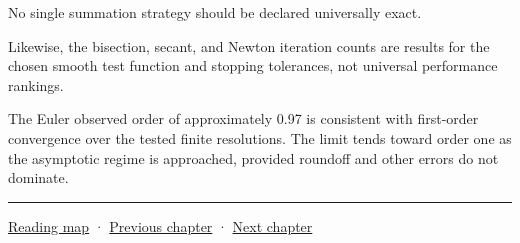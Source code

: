 No single summation strategy should be declared universally exact.

Likewise, the bisection, secant, and Newton iteration counts are results for the chosen smooth test function and stopping tolerances, not universal performance rankings.

The Euler observed order of approximately 0.97 is consistent with first-order convergence over the tested finite resolutions. The limit tends toward order one as the asymptotic regime is approached, provided roundoff and other errors do not dominate.

\begin{center}\rule{0.5\linewidth}{0.5pt}\end{center}

\href{Chapter\%20Edition/01\%20-\%20Computing\%20Foundations/00\%20-\%20Reading\%20Map}{Reading map} · \hyperref[02-foundations-ii-ch030]{Previous chapter} · \hyperref[02-foundations-ii-ch032]{Next chapter}
